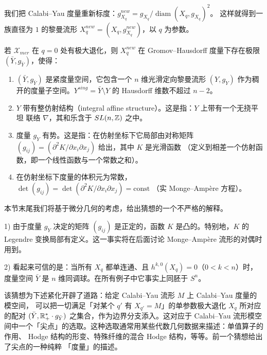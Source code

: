 我们把 Calabi--Yau 度量重新标度：$g^{new}_{X_q}=g_{X_q}/\operatorname{diam}(X_q,g_{X_q})^2$。
这样就得到一族直径为 $1$ 的黎曼流形 $X_q^{new}=(X_q,g^{new}_{X_q})$，以 $q$ 为参数。

\begin{conj}
若 $\mathcal{X}_{mer}$ 在 $q=0$ 处有极大退化，则 $X_q^{new}$ 在 Gromov--Hausdorff
度量下存在极限 $(\bar Y,g_{\bar Y})$，使得：
\begin{enumerate}[label=\textup{\alph*}),leftmargin=2em,itemsep=2pt]
  \item $(\bar Y,g_{\bar Y})$ 是紧度量空间，它包含一个 $n$ 维光滑定向黎曼流形 $(Y,g_Y)$
        作为稠开的度量子空间。$Y^{sing}=\bar Y\setminus Y$ 的 Hausdorff 维数不超过 $n-2$。
  \item $Y$ 带有整仿射结构（integral affine structure）。这是指：$Y$ 上带有一个无挠平坦
        联络 $\nabla$，其和乐含于 $SL(n,\mathbb{Z})$ 之中。
  \item 度量 $g_Y$ 有势。这是指：在仿射坐标下它局部由对称矩阵
        $(g_{ij})=(\partial^2K/\partial x_i\partial x_j)$ 给出，其中 $K$ 是光滑函数
        （定义到相差一个仿射函数，即一个线性函数与一个常数之和）。
  \item 在仿射坐标下度量的体积元为常数，
        $\det(g_{ij})=\det(\partial^2K/\partial x_i\partial x_j)=\mathrm{const}$
        （实 Monge--Ampère 方程）。
\end{enumerate}
\end{conj}

本节末尾我们将基于微分几何的考虑，给出猜想的一个不严格的解释。

\begin{rmk}
1) 由于度量 $g_Y$ 决定的矩阵 $(g_{ij})$ 是正定的，函数 $K$ 是凸的。特别地，$K$ 的
Legendre 变换局部有定义。这一事实将在后面讨论 Monge--Ampère 流形的对偶时用到。

2) 看起来可信的是：当所有 $X_q$ 都单连通、且 $h^{k,0}(X_q)=0$（$0<k<n$）时，度量空间
$\bar Y$ 是 $n$ 维同调球。在所有例子中它事实上同胚于 $S^n$。
\end{rmk}

该猜想为下述紧化开辟了道路：给定 Calabi--Yau 流形 $M$ 上 Calabi--Yau 度量的模空间，
可以把一切满足「对某个 $q'$ 有 $X_{q'}=M$」的单参数极大退化 $X_q$ 所对应的配对
$(\bar Y,\mathbb{R}^*_+\cdot g_{\bar Y})$ 之集合，作为边界分支添入。这对应于 Calabi--Yau
流形模空间中一个「尖点」的选取。这种选取通常用某些代数几何数据来描述：单值算子的作用、
Hodge 结构的形变、特殊纤维的混合 Hodge 结构，等等。前一个猜想给出了尖点的一种纯粹
「度量」的描述。

